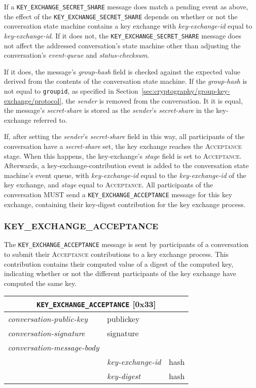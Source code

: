 \documentclass{article}
\def\message#1{\texttt{#1}}
\def\field#1{\textit{#1}}
\def\smfield#1{\textsl{#1}}
\def\type#1{\textsf{#1}}
\newenvironment{conversationmessage}[2]{
\newcommand{\messagefield}[2]{
& \field{##1} & \type{##2} \\
\hline
}
\hspace{2em minus 2em}\begin{tabular}{|l|l|l|}
\hline
\multicolumn{3}{|c|}{\message{#1} [#2]} \\
\hline
\hline
\field{conversation-public-key} & \multicolumn{2}{l|}{\type{publickey}} \\
\hline
\field{conversation-signature} & \multicolumn{2}{l|}{\type{signature}} \\
\hline
\field{conversation-message-body} & \multicolumn{2}{l|}{} \\
\hline
}{
\end{tabular}
}
\begin{document}
If a \message{KEY\_EXCHANGE\_SECRET\_SHARE} message does match a pending event as above, the effect of the \message{KEY\_EXCHANGE\_SECRET\_SHARE} depends on whether or not the conversation state machine contains a key exchange with \smfield{key-exchange-id} equal to \field{key-exchange-id}.
If it does not, the \message{KEY\_EXCHANGE\_SECRET\_SHARE} message does not affect the addressed conversation's state machine other than adjusting the conversation's \smfield{event-queue} and \smfield{status-checksum}.

If it does, the message's \field{group-hash} field is checked against the expected value derived from the contents of the conversation state machine.
If the \field{group-hash} is not equal to \texttt{groupid}, as specified in Section~\ref{sec:cryptography/group-key-exchange/protocol}, the \field{sender} is removed from the conversation.
It it is equal, the message's \field{secret-share} is stored as the \field{sender}'s \smfield{secret-share} in the \type{key-exchange} referred to.

If, after setting the \field{sender}'s \smfield{secret-share} field in this way, all participants of the conversation have a \smfield{secret-share} set, the key exchange reaches the \textsc{Acceptance} stage.
When this happens, the \type{key-exchange}'s \smfield{stage} field is set to \textsc{Acceptance}.
Afterwards, a \type{key-exchange-contribution} event is added to the conversation state machine's event queue, with \smfield{key-exchange-id} equal to the \smfield{key-exchange-id} of the key exchange, and \smfield{stage} equal to \textsc{Acceptance}.
All participants of the conversation MUST send a \message{KEY\_EXCHANGE\_ACCEPTANCE} message for this key exchange, containing their key-digest contribution for the key exchange process.


\subsubsection{KEY\_EXCHANGE\_ACCEPTANCE}
\label{sec:messages/key-exchange-acceptance}

The \message{KEY\_EXCHANGE\_ACCEPTANCE} message is sent by participants of a conversation to submit their \textsc{Acceptance} contributions to a key exchange process.
This contribution contains their computed value of a digest of the computed key, indicating whether or not the different participants of the key exchange have computed the same key.

\begin{conversationmessage}{KEY\_EXCHANGE\_ACCEPTANCE}{0x33}
\messagefield{key-exchange-id}{hash}
\messagefield{key-digest}{hash}
\end{conversationmessage}
\end{document}
